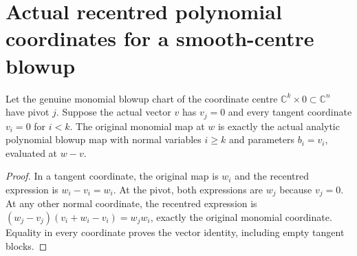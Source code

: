 \section{Actual recentred polynomial coordinates for a smooth-centre blowup}

\begin{lemma}
\label{hir:actual-smooth-centre-monomial-recentring}
\leanok
Let the genuine monomial blowup chart of the coordinate centre
$\mathbb C^k\times0\subset\mathbb C^n$ have pivot $j$. Suppose the
actual vector $v$ has $v_j=0$ and every tangent coordinate $v_i=0$
for $i<k$. The original monomial map at $w$ is exactly the actual
analytic polynomial blowup map with normal variables $i\ge k$ and
parameters $b_i=v_i$, evaluated at $w-v$.
\end{lemma}
\begin{proof}
In a tangent coordinate, the original map is $w_i$ and the recentred
expression is $w_i-v_i=w_i$. At the pivot, both expressions are $w_j$
because $v_j=0$. At any other normal coordinate, the recentred
expression is $(w_j-v_j)(v_i+w_i-v_i)=w_jw_i$, exactly the original
monomial coordinate. Equality in every coordinate proves the vector
identity, including empty tangent blocks.
\end{proof}

